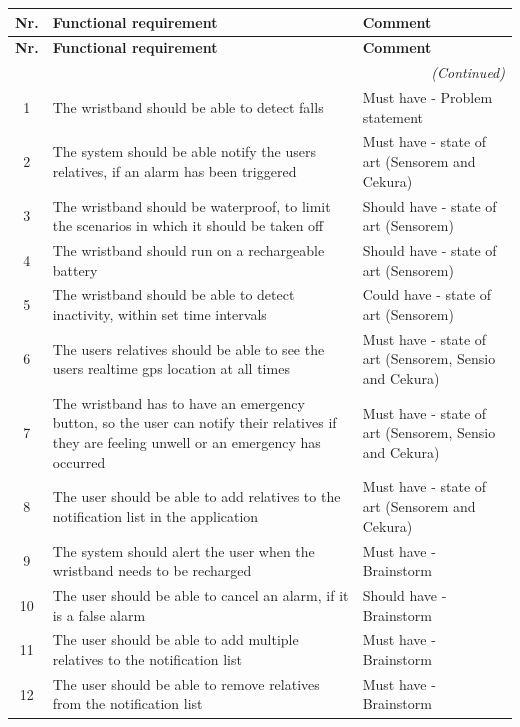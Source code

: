 \begin{longtable}{|c|p{8cm}|p{4cm}|}
\hline
\textbf{Nr.} & \textbf{Functional requirement} & \textbf{Comment} \\
\hline
\endfirsthead

\hline
\textbf{Nr.} & \textbf{Functional requirement} & \textbf{Comment} \\
\hline
\endhead

\hline
\multicolumn{3}{r}{\textit{(Continued)}} \\
\hline
\endfoot

\hline
\endlastfoot

1 & The wristband should be able to detect falls & Must have - Problem statement  \\
\hline
2 & The system should be able notify the users relatives, if an alarm has been triggered & Must have - state of art (Sensorem and Cekura)  \\
\hline
3 & The wristband should be waterproof, to limit the scenarios in which it should be taken off & Should have - state of art (Sensorem) \\
\hline
4 & The wristband should run on a rechargeable battery & Should have - state of art (Sensorem)  \\
\hline
5 & The wristband should be able to detect inactivity, within set time intervals & Could have - state of art (Sensorem) \\
\hline
6 & The users relatives should be able to see the users realtime \gls{gps} location at all times & Must have - state of art (Sensorem, Sensio and Cekura)  \\
\hline
7 & The wristband has to have an emergency button, so the user can notify their relatives if they are feeling unwell or an emergency has occurred & Must have - state of art (Sensorem, Sensio and Cekura)  \\
\hline
8 & The user should be able to add relatives to the notification list in the application & Must have - state of art (Sensorem and Cekura)  \\
\hline
9 & The system should alert the user when the wristband needs to be recharged & Must have - Brainstorm \\
\hline
10 & The user should be able to cancel an alarm, if it is a false alarm & Should have - Brainstorm  \\
\hline
11 & The user should be able to add multiple relatives to the notification list & Must have - Brainstorm \\
\hline
12 & The user should be able to remove relatives from the notification list & Must have - Brainstorm \\

\end{longtable}
